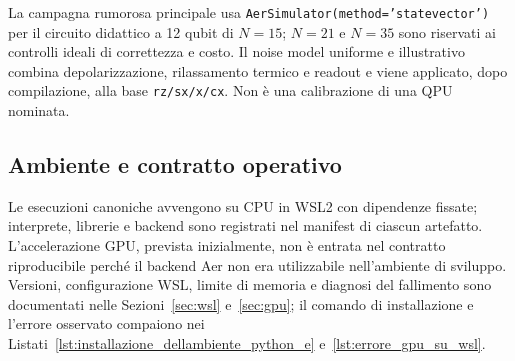 \begin{onehalfspace}
La campagna rumorosa principale usa
\texttt{AerSimulator(method='statevector')} per il circuito didattico a 12 qubit di
$N=15$; $N=21$ e $N=35$ sono riservati ai controlli ideali di correttezza e costo.
Il noise model uniforme e illustrativo combina depolarizzazione, rilassamento termico e
readout e viene applicato, dopo compilazione, alla base \texttt{rz/sx/x/cx}. Non è una
calibrazione di una QPU nominata.

\subsection{Ambiente e contratto operativo}
\label{sec:setup}

Le esecuzioni canoniche avvengono su \ac{CPU} in \ac{WSL}2 con dipendenze fissate;
interprete, librerie e backend sono registrati nel manifest di ciascun artefatto.
L'accelerazione \ac{GPU}, prevista inizialmente, non è entrata nel contratto
riproducibile perché il backend Aer non era utilizzabile nell'ambiente di sviluppo.
\label{sec:gpu_limit} Versioni, configurazione WSL, limite di memoria e diagnosi del
fallimento sono documentati nelle Sezioni~\ref{sec:wsl} e~\ref{sec:gpu}; il comando di
installazione e l'errore osservato compaiono nei
Listati~\ref{lst:installazione_dellambiente_python_e}
e~\ref{lst:errore_gpu_su_wsl}.

\end{onehalfspace}

